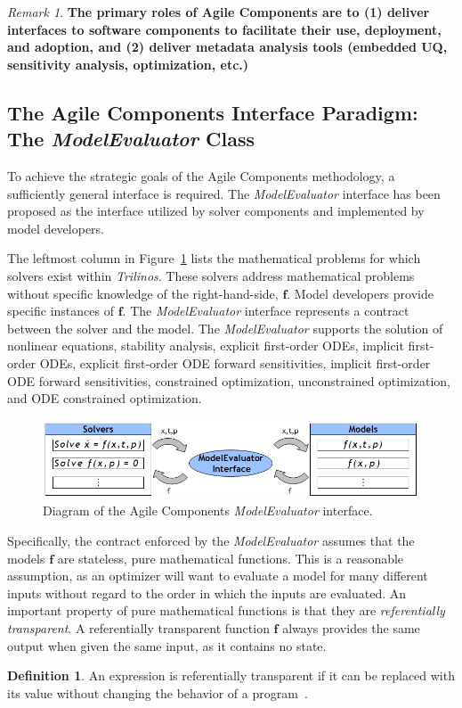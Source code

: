 \documentclass[10pt]{article}
\theoremstyle{plain}
\theoremstyle{definition}
\newtheorem{defn}{Definition}[section]
\theoremstyle{remark}
\newtheorem{rem}{Remark}[section]
\numberwithin{equation}{section}
\begin{document}
\begin{rem}
\textbf{The primary roles of Agile Components are to (1) deliver interfaces to software components to facilitate their use, deployment, and adoption, and (2) deliver metadata analysis tools (embedded UQ, sensitivity analysis, optimization, etc.)}
\end{rem}

\subsection{The Agile Components Interface Paradigm: The \emph{ModelEvaluator} Class}

To achieve the strategic goals of the Agile Components methodology, a sufficiently general interface is required. The \emph{ModelEvaluator} interface has been proposed as the interface utilized by solver components and implemented by model developers.

The leftmost column in Figure~\ref{fig:ACModelEvaluator} lists the mathematical problems for which solvers exist within \emph{Trilinos}. These solvers address mathematical problems without specific knowledge of the right-hand-side, $\mathbf{f}$. Model developers provide specific instances of $\mathbf{f}$. The \emph{ModelEvaluator} interface represents a contract between the solver and the model. The \emph{ModelEvaluator} supports the solution of nonlinear equations, stability analysis, explicit first-order ODEs, implicit first-order ODEs, explicit first-order ODE forward sensitivities, implicit first-order ODE forward sensitivities, constrained optimization, unconstrained optimization, and ODE constrained optimization.

\begin{figure}[h!]
\begin{center}
	\includegraphics[width=\linewidth]{ModelEvaluatorInterface}
 \end{center}
 \caption{Diagram of the Agile Components \emph{ModelEvaluator} interface.}
\label{fig:ACModelEvaluator}
\end{figure}

Specifically, the contract enforced by the \emph{ModelEvaluator} assumes that the models $\mathbf{f}$ are stateless, pure mathematical functions. This is a reasonable assumption, as an optimizer will want to evaluate a model for many different inputs without regard to the order in which the inputs are evaluated. An important property of pure mathematical functions is that they are \emph{referentially transparent}. A referentially transparent function $\mathbf{f}$ always provides the same output when given the same input, as it contains no state.
\begin{defn} \label{defn:RT}
An expression is referentially transparent if it can be replaced with its value without changing the behavior of a program~\cite{HGVJ:1994:DesignPatterns}.
\end{defn}
\end{document}
